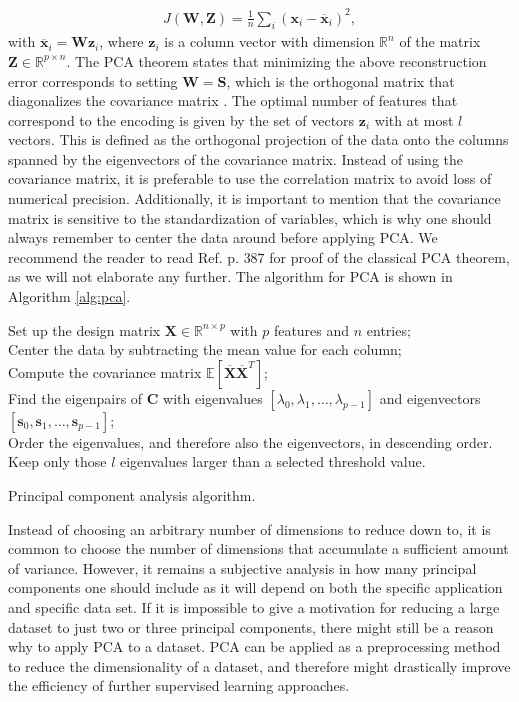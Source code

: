 \begin{align}
  J(\boldsymbol{W},\boldsymbol{Z}) = \frac{1}{n}\sum_i (\boldsymbol{x}_i - \overline{\boldsymbol{x}}_i)^2,
\end{align}
with $\overline{\boldsymbol{x}}_i = \boldsymbol{W}\boldsymbol{z}_i$, where $\boldsymbol{z}_i$ is a column vector with dimension ${\mathbb{R}}^{n}$ of the matrix
$\boldsymbol{Z}\in{\mathbb{R}}^{p\times n}$. The PCA theorem states that minimizing the above reconstruction error corresponds to setting $\boldsymbol{W}=\boldsymbol{S}$, which is the orthogonal matrix that diagonalizes the covariance matrix \cite{Murphy2012}. The optimal number of features that correspond to the encoding is given by the set of vectors $\boldsymbol{z}_i$ with at most $l$ vectors. This is defined as the orthogonal projection of the data onto the columns spanned by the eigenvectors of the covariance matrix. Instead of using the covariance matrix, it is preferable to use the correlation matrix to avoid loss of numerical precision. Additionally, it is important to mention that the covariance matrix is sensitive to the standardization of variables, which is why one should always remember to center the data around before applying PCA.  We recommend the reader to read Ref. \cite{Murphy2012} p. $387$ for proof of the classical PCA theorem, as we will not elaborate any further. The algorithm for PCA is shown in Algorithm \ref{alg:pca}.

\begin{algorithm}[H]
\SetAlgoLined
 Set up the design matrix $\boldsymbol{X}\in {\mathbb{R}}^{n\times p}$ with $p$ features and $n$ entries;\\
 Center the data by subtracting the mean value for each column;\\
 Compute the covariance matrix $\mathbb{E}[\overline{\boldsymbol{X}}\overline{\boldsymbol{X}}^T]$; \\
 Find the eigenpairs of $\boldsymbol{C}$ with eigenvalues $[\lambda_0,\lambda_1,\dots,\lambda_{p-1}]$ and eigenvectors $[\boldsymbol{s}_0,\boldsymbol{s}_1,\dots,\boldsymbol{s}_{p-1}]$;\\
 Order the eigenvalues, and therefore also the eigenvectors, in descending order.
 Keep only those $l$ eigenvalues larger than a selected threshold value.
 \caption{Principal component analysis algorithm.}
 \label{alg:pca}
\end{algorithm}

\noindent Instead of choosing an arbitrary number of dimensions to reduce down to, it is common to choose the number of dimensions that accumulate a sufficient amount of variance. However, it remains a subjective analysis in how many principal components one should include as it will depend on both the specific application and specific data set. If it is impossible to give a motivation for reducing a large dataset to just two or three principal components, there might still be a reason why to apply PCA to a dataset. PCA can be applied as a preprocessing method to reduce the dimensionality of a dataset, and therefore might drastically improve the efficiency of further supervised learning approaches.

